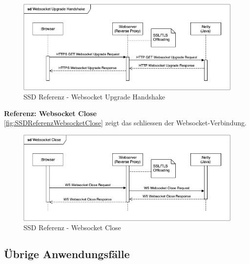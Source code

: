 \documentclass[11pt,ngerman]{article}
\begin{document}
                \begin{figure}[H]
                    \centering
                    \includegraphics[scale=0.6]{figures/SSD-Websocket_Upgrade_Handshake.png}
                    \caption{SSD Referenz - \Gls{Websocket} Upgrade Handshake}
                    \label{fig:SSDReferenzWebsocketUpgrade}
                \end{figure}
                \noindent \textbf{Referenz: \Gls{Websocket} Close} \\
                \autoref{fig:SSDReferenzWebsocketClose} zeigt das schliessen der \Gls{Websocket}-Verbindung.
                \begin{figure}[H]
                    \centering
                    \includegraphics[scale=0.6]{figures/SSD-Websocket_Close.png}
                    \caption{SSD Referenz - \Gls{Websocket} Close}
                    \label{fig:SSDReferenzWebsocketClose}
                \end{figure}

        \subsection{Übrige Anwendungsfälle}
\end{document}
